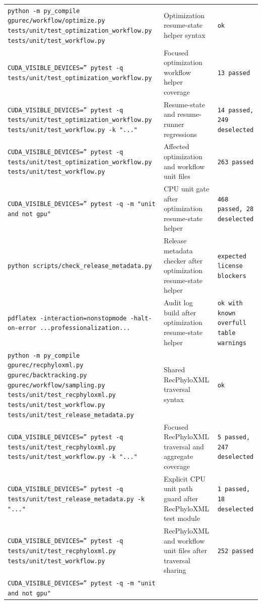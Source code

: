 \documentclass[11pt]{article}
\begin{document}
\begin{center}
\begin{tabular}{lll}
\texttt{python -m py\_compile gpurec/workflow/optimize.py tests/unit/test\_optimization\_workflow.py tests/unit/test\_workflow.py} &
Optimization resume-state helper syntax &
\texttt{ok} \\
\texttt{CUDA\_VISIBLE\_DEVICES='' pytest -q tests/unit/test\_optimization\_workflow.py} &
Focused optimization workflow helper coverage &
\texttt{13 passed} \\
\texttt{CUDA\_VISIBLE\_DEVICES='' pytest -q tests/unit/test\_optimization\_workflow.py tests/unit/test\_workflow.py -k "..."} &
Resume-state and resume-runner regressions &
\texttt{14 passed, 249 deselected} \\
\texttt{CUDA\_VISIBLE\_DEVICES='' pytest -q tests/unit/test\_optimization\_workflow.py tests/unit/test\_workflow.py} &
Affected optimization and workflow unit files &
\texttt{263 passed} \\
\texttt{CUDA\_VISIBLE\_DEVICES='' pytest -q -m "unit and not gpu"} &
CPU unit gate after optimization resume-state helper &
\texttt{468 passed, 28 deselected} \\
\texttt{python scripts/check\_release\_metadata.py} &
Release metadata checker after optimization resume-state helper &
\texttt{expected license blockers} \\
\texttt{pdflatex -interaction=nonstopmode -halt-on-error ...professionalization...} &
Audit log build after optimization resume-state helper &
\texttt{ok with known overfull table warnings} \\
\texttt{python -m py\_compile gpurec/recphyloxml.py gpurec/backtracking.py gpurec/workflow/sampling.py tests/unit/test\_recphyloxml.py tests/unit/test\_workflow.py tests/unit/test\_release\_metadata.py} &
Shared RecPhyloXML traversal syntax &
\texttt{ok} \\
\texttt{CUDA\_VISIBLE\_DEVICES='' pytest -q tests/unit/test\_recphyloxml.py tests/unit/test\_workflow.py -k "..."} &
Focused RecPhyloXML traversal and aggregate coverage &
\texttt{5 passed, 247 deselected} \\
\texttt{CUDA\_VISIBLE\_DEVICES='' pytest -q tests/unit/test\_release\_metadata.py -k "..."} &
Explicit CPU unit path guard after RecPhyloXML test module &
\texttt{1 passed, 18 deselected} \\
\texttt{CUDA\_VISIBLE\_DEVICES='' pytest -q tests/unit/test\_recphyloxml.py tests/unit/test\_workflow.py} &
RecPhyloXML and workflow unit files after traversal sharing &
\texttt{252 passed} \\
\texttt{CUDA\_VISIBLE\_DEVICES='' pytest -q -m "unit and not gpu"} &

\end{tabular}
\end{center}
\end{document}
